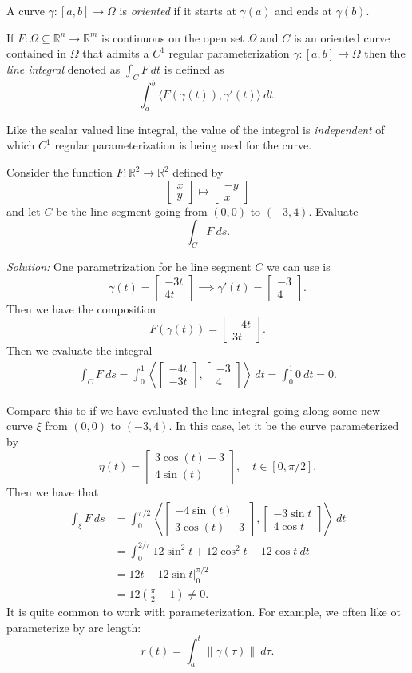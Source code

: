 \documentclass[11pt]{article}
\theoremstyle{definition}
\newcommand{\R}{\mathbb{R}}                      %
\newcommand{\mat}{\begin{bmatrix}}
\newcommand{\trix}{\end{bmatrix}}
\begin{document}
\begin{mdframed}[backgroundcolor = blue!10]
\vspace{+0.1cm}
 A curve $\gamma:[a,b]\to \Omega$ is \textit{oriented} if it starts at $\gamma(a)$ and ends at $\gamma(b)$.

 If $F:\Omega\subseteq \R^n\to \R^m$ is continuous on the open set $\Omega$ and $C$ is an oriented curve contained in $\Omega$ that admits a $C^1$ regular parameterization $\gamma:[a,b]\to \Omega$ then the \textit{line integral} denoted as $\int_C F~dt$ is defined as 
$$
\int_a^b \langle F(\gamma(t)),\gamma'(t)\rangle ~dt.
$$
\end{mdframed}
\note Like the scalar valued line integral, the value of the integral is \textit{independent} of which $C^1$ regular parameterization is being used for the curve.

\ex Consider the function $F:\R^2\to \R^2$ defined by
$$
\mat x\\y\trix \mapsto \mat -y \\ x \trix
$$
and let $C$ be the line segment going from $(0,0)$ to $(-3,4)$. Evaluate
$$
\int_C F~ds.
$$

\textit{Solution:} One parametrization for he line segment $C$ we can use is
$$
\gamma(t)=\mat -3t \\ 4t \trix \implies \gamma'(t) = \mat -3 \\ 4 \trix.
$$
Then we have the composition
$$
F(\gamma(t)) =\mat -4t \\ 3t \trix.
$$
Then we evaluate the integral
$$
\begin{aligned}
\int_C F~ds = \int_0^1 \left\langle \mat -4t\\ -3t \trix, \mat -3 \\ 4 \trix \right\rangle ~dt= \int_0^1 0 ~dt=0.
\end{aligned}
$$

Compare this to if we have evaluated the line integral going along some new curve $\xi$ from $(0,0)$ to $(-3,4)$. In this case, let it be the curve parameterized by 
$$
\eta(t)=\mat 3\cos(t) - 3 \\ 4\sin(t) \trix, \quad t\in [0,\pi/2]. 
$$
Then we have that
$$
\begin{aligned}
\int_\xi F~ds &= \int_0^{\pi/2} \left\langle \mat -4\sin (t) \\ 3\cos(t)-3 \trix, \mat -3\sin t \\ 4\cos t \trix \right\rangle~dt \\
&=\int_0^{2/\pi} 12\sin^2 t +12\cos^2t -12\cos t ~dt \\
&= \left. 12t - 12\sin t \right|_0^{\pi/2}\\
&= 12\left(\frac{\pi}{2}-1\right)\neq 0.
\end{aligned}
$$
\note It is quite common to work with  parameterization. For example, we often like ot parameterize by arc length:
$$
r(t) = \int_a^t \|\gamma(\tau)\|~d\tau.
$$
\end{document}
